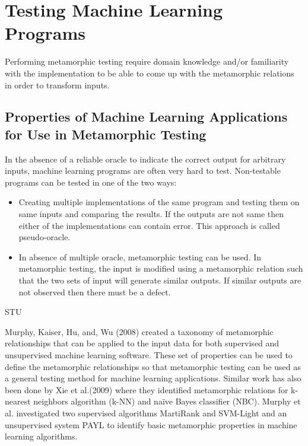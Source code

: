 \section{Testing Machine Learning Programs}
Performing metamorphic testing require domain knowledge and/or familiarity with the implementation to be able to come up with the metamorphic relations in order to transform inputs.
\subsection{Properties of Machine Learning Applications for Use in Metamorphic Testing \cite{Murphy2008}}
In the absence of a reliable oracle to indicate the correct output for arbitrary inputs, machine learning programs are often very hard to test. Non-testable programs can be tested in one of the two ways:
\begin{itemize}
  \item Creating multiple implementations of the same program and testing them on same inputs and comparing the results. If the outputs are not same then either of the implementations can contain error. This approach is called pseudo-oracle.
  \item In absence of multiple oracle, metamorphic testing can be used. In metamorphic testing, the input is modified using a metamorphic relation such that the two sets of input will generate similar outputs. If similar outputs are not observed then there must be a defect.
\end{itemize}
STU


Murphy, Kaiser, Hu, and, Wu (2008) created a taxonomy of metamorphic relationships that can be applied to the input data for both supervised and unsupervised machine learning software. These set of properties can be used to define the metamorphic relationships so that metamorphic testing can be used as a general testing method for machine learning applications\cite{Murphy2008}. Similar work has also been done by Xie et al.(2009) where they identified metamorphic relations for k-nearest neighbors algorithm (k-NN) and naïve Bayes classifier (NBC).
Murphy et al. investigated two supervised algorithms MartiRank and SVM-Light and an unsupervised system PAYL to identify basic metamorphic properties in machine learning algorithms. 

